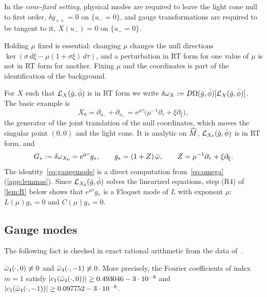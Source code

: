 \begin{definition}\label{def:conefixed}
In the \emph{cone-fixed setting}, physical modes are required to leave the light cone null to first order,
$\delta g_{++}=0$ on $\{u_-=0\}$, and gauge transformations are required to be tangent to it,
$X(u_-)=0$ on $\{u_-=0\}$.
\end{definition}

Holding $\mu$ fixed is essential: changing $\mu$ changes the null directions
$\ker(\sigma\,d\xi-\mu(1+\sigma\xi)\,d\tau)$, and a perturbation in RT form for one value of $\mu$ is not in
RT form for another. Fixing $\mu$ and the coordinates is part of the identification of the background.

For $X$ such that $\mathcal{L}_X(\bar g,\bar\phi)$ is in RT form we write
$\delta\omega_X:=D\Omega(\bar g,\bar\phi)[\mathcal{L}_X(\bar g,\bar\phi)]$. The basic example is
\begin{equation}\label{eq:X0}
  X_0=\partial_{u_-}+\partial_{u_+}=e^{\mu\tau}\big(\mu^{-1}\partial_\tau+\xi\partial_\xi\big),
\end{equation}
the generator of the joint translation of the null coordinates, which moves the singular point $(0,0)$ and
the light cone. It is analytic on $\widehat M$, $\mathcal{L}_{X_0}(\bar g,\bar\phi)$ is in RT form, and
\begin{equation}\label{eq:gaugemode}
  G_*:=\delta\omega_{X_0}=e^{\mu\tau}g_*,\qquad g_*=(1+Z)\,\bar\omega,\qquad Z=\mu^{-1}\partial_\tau+\xi\partial_\xi .
\end{equation}
The identity~\eqref{eq:gaugemode} is a direct computation from~\eqref{eq:omega} (\cref{app:lemmas}). Since
$\mathcal{L}_{X_0}(\bar g,\bar\phi)$ solves the linearized equations, step (R4) of \cref{lem:R} below shows that
$e^{\mu\tau}g_*$ is a Floquet mode of $L$ with exponent $\mu$: $L(\mu)g_*=0$ and $C(\mu)g_*=0$.

\subsection{Gauge modes}\label{sec:physical-gauge}

The following fact is checked in exact rational arithmetic from the data of~\cite{RT2019}.

\begin{lemma}[F1]\label{lem:F1}
$\bar\omega_4(\cdot,0)\not\equiv0$ and $\bar\omega_4(\cdot,-1)\not\equiv0$. More precisely, the Fourier
coefficients of index $m=1$ satisfy $|c_1(\bar\omega_4(\cdot,0))|\ge0.493046-3\cdot10^{-8}$ and
$|c_1(\bar\omega_4(\cdot,-1))|\ge0.097752-3\cdot10^{-8}$.
\end{lemma}

